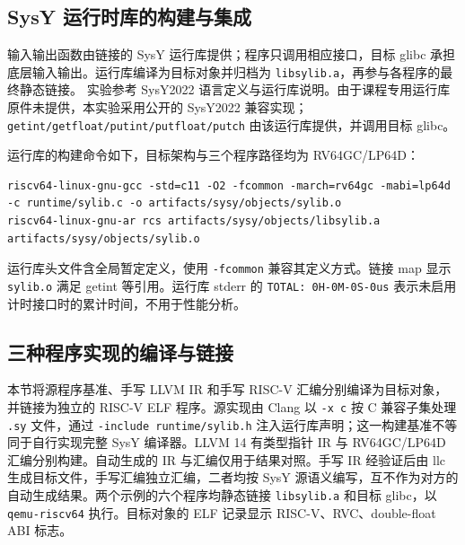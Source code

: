 \subsection{SysY 运行时库的构建与集成}
\label{sec:sysy-runtime}
输入输出函数由链接的 SysY 运行库提供；程序只调用相应接口，目标 glibc 承担底层输入输出。运行库编译为目标对象并归档为 \texttt{libsylib.a}，再参与各程序的最终静态链接。
实验参考 SysY2022 语言定义与运行库说明\cite{sysyspec}。由于课程专用运行库原件未提供，本实验采用公开的 SysY2022 兼容实现\cite{runtime}；\texttt{getint/getfloat/putint/putfloat/putch} 由该运行库提供，并调用目标 glibc。

运行库的构建命令如下，目标架构与三个程序路径均为 RV64GC/LP64D：
\begin{lstlisting}[caption={SysY 运行库对象与静态归档的构建},label={lst:sysy-runtime-build}]
riscv64-linux-gnu-gcc -std=c11 -O2 -fcommon -march=rv64gc -mabi=lp64d -c runtime/sylib.c -o artifacts/sysy/objects/sylib.o
riscv64-linux-gnu-ar rcs artifacts/sysy/objects/libsylib.a artifacts/sysy/objects/sylib.o
\end{lstlisting}
运行库头文件含全局暂定定义，使用 \texttt{-fcommon} 兼容其定义方式。链接 map 显示 \texttt{sylib.o} 满足 getint 等引用。运行库 stderr 的 \texttt{TOTAL: 0H-0M-0S-0us} 表示未启用计时接口时的累计时间，不用于性能分析。

\subsection{三种程序实现的编译与链接}
\label{sec:sysy-build}
本节将源程序基准、手写 LLVM IR 和手写 RISC-V 汇编分别编译为目标对象，并链接为独立的 RISC-V ELF 程序。源实现由 Clang 以 \texttt{-x c} 按 C 兼容子集处理 \texttt{.sy} 文件，通过 \texttt{-include runtime/sylib.h} 注入运行库声明；这一构建基准不等同于自行实现完整 SysY 编译器。LLVM 14 有类型指针 IR 与 RV64GC/LP64D 汇编分别构建。自动生成的 IR 与汇编仅用于结果对照。手写 IR 经验证后由 llc 生成目标文件，手写汇编独立汇编，二者均按 SysY 源语义编写，互不作为对方的自动生成结果。两个示例的六个程序均静态链接 \texttt{libsylib.a} 和目标 glibc，以 \texttt{qemu-riscv64} 执行。目标对象的 ELF 记录显示 RISC-V、RVC、double-float ABI 标志。

